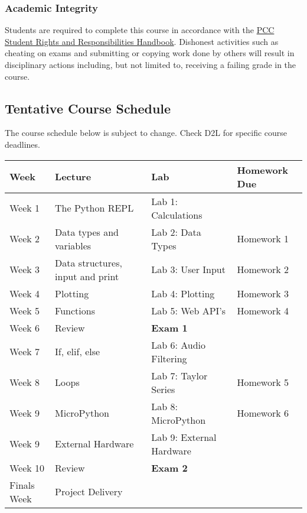 \documentclass[11pt]{article}
\begin{document}
    \hypertarget{academic-integrity}{%
\subsubsection{Academic Integrity}\label{academic-integrity}}

Students are required to complete this course in accordance with the
\href{https://www.pcc.edu/about/policy/student-rights/documents/student-conduct.pdf}{PCC
Student Rights and Responsibilities Handbook}. Dishonest activities such
as cheating on exams and submitting or copying work done by others will
result in disciplinary actions including, but not limited to, receiving
a failing grade in the course.

    \hypertarget{tentative-course-schedule}{%
\subsection{Tentative Course Schedule}\label{tentative-course-schedule}}

The course schedule below is subject to change. Check D2L for specific
course deadlines.

\begin{longtable}[]{@{}llll@{}}
\toprule
Week & Lecture & Lab & Homework Due\tabularnewline
\midrule
\endhead
Week 1 & The Python REPL & Lab 1: Calculations &\tabularnewline
Week 2 & Data types and variables & Lab 2: Data Types & Homework
1\tabularnewline
Week 3 & Data structures, input and print & Lab 3: User Input & Homework
2\tabularnewline
Week 4 & Plotting & Lab 4: Plotting & Homework 3\tabularnewline
Week 5 & Functions & Lab 5: Web API's & Homework 4\tabularnewline
Week 6 & Review & \textbf{Exam 1} &\tabularnewline
Week 7 & If, elif, else & Lab 6: Audio Filtering &\tabularnewline
Week 8 & Loops & Lab 7: Taylor Series & Homework 5\tabularnewline
Week 9 & MicroPython & Lab 8: MicroPython & Homework 6\tabularnewline
Week 9 & External Hardware & Lab 9: External Hardware &\tabularnewline
Week 10 & Review & \textbf{Exam 2} &\tabularnewline
Finals Week & Project Delivery & &\tabularnewline
\bottomrule
\end{longtable}


    
    
    
    
\end{document}
